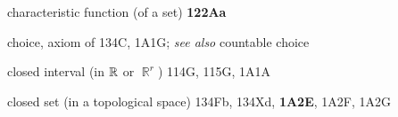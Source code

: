 


























characteristic function (of a set) {\bf 122Aa}











choice, axiom of 134C, 1A1G; 
 {\it see also} countable choice





























closed interval (in $\Bbb R$ or $\BbbR^r$) 114G, 115G, 1A1A

closed set (in a topological space) 134Fb, 134Xd, {\bf 1A2E}, 1A2F,
1A2G
















